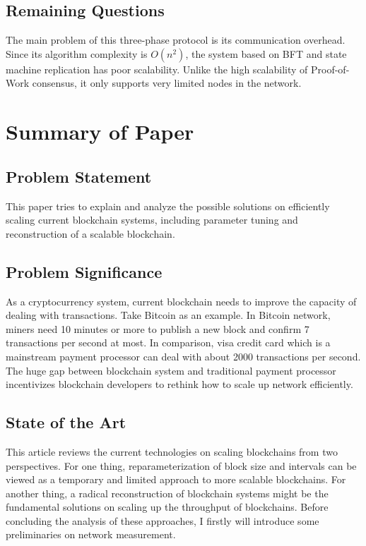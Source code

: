 \documentclass[conference]{IEEEtran}
\begin{document}
\subsection{Remaining Questions}
The main problem of this three-phase protocol is its communication overhead. 
%
Since its algorithm complexity is $O(n^2)$, the system based on BFT and state machine replication has poor scalability.
%
Unlike the high scalability of Proof-of-Work consensus, it only supports very limited nodes in the network.


\section{Summary of Paper\cite{croman2016scaling}}

\subsection{Problem Statement}
This paper tries to explain and analyze the possible solutions on efficiently scaling current blockchain systems, including parameter tuning and reconstruction of a scalable blockchain.

\subsection{Problem Significance}
As a cryptocurrency system, current blockchain needs to improve the capacity of dealing with transactions.
%
Take Bitcoin as an example.
%
In Bitcoin network, miners need 10 minutes or more to publish a new block and confirm 7 transactions per second at most.
%
In comparison, visa credit card which is a mainstream payment processor can deal with about 2000 transactions per second.
%
The huge gap between blockchain system and traditional payment processor incentivizes blockchain developers to rethink how to scale up network efficiently.

\subsection{State of the Art}
This article reviews the current technologies on scaling blockchains from two perspectives.
%
For one thing, reparameterization of block size and intervals can be viewed as a temporary and limited approach to more scalable blockchains.
%
For another thing, a radical reconstruction of blockchain systems might be the fundamental solutions on scaling up the throughput of blockchains.  
%
Before concluding the analysis of these approaches, I firstly will introduce some preliminaries on network measurement.
\end{document}
